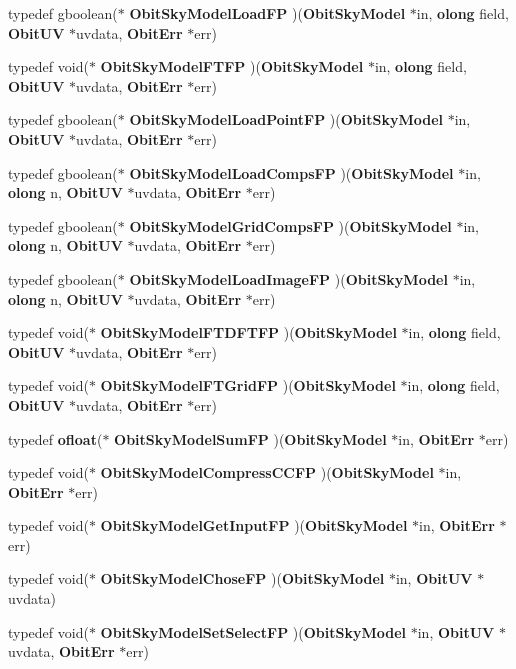 \begin{CompactItemize}
\item 
typedef gboolean($\ast$ {\bf Obit\-Sky\-Model\-Load\-FP} )({\bf Obit\-Sky\-Model} $\ast$in, {\bf olong} field, {\bf Obit\-UV} $\ast$uvdata, {\bf Obit\-Err} $\ast$err)
\item 
typedef void($\ast$ {\bf Obit\-Sky\-Model\-FTFP} )({\bf Obit\-Sky\-Model} $\ast$in, {\bf olong} field, {\bf Obit\-UV} $\ast$uvdata, {\bf Obit\-Err} $\ast$err)
\item 
typedef gboolean($\ast$ {\bf Obit\-Sky\-Model\-Load\-Point\-FP} )({\bf Obit\-Sky\-Model} $\ast$in, {\bf Obit\-UV} $\ast$uvdata, {\bf Obit\-Err} $\ast$err)
\item 
typedef gboolean($\ast$ {\bf Obit\-Sky\-Model\-Load\-Comps\-FP} )({\bf Obit\-Sky\-Model} $\ast$in, {\bf olong} n, {\bf Obit\-UV} $\ast$uvdata, {\bf Obit\-Err} $\ast$err)
\item 
typedef gboolean($\ast$ {\bf Obit\-Sky\-Model\-Grid\-Comps\-FP} )({\bf Obit\-Sky\-Model} $\ast$in, {\bf olong} n, {\bf Obit\-UV} $\ast$uvdata, {\bf Obit\-Err} $\ast$err)
\item 
typedef gboolean($\ast$ {\bf Obit\-Sky\-Model\-Load\-Image\-FP} )({\bf Obit\-Sky\-Model} $\ast$in, {\bf olong} n, {\bf Obit\-UV} $\ast$uvdata, {\bf Obit\-Err} $\ast$err)
\item 
typedef void($\ast$ {\bf Obit\-Sky\-Model\-FTDFTFP} )({\bf Obit\-Sky\-Model} $\ast$in, {\bf olong} field, {\bf Obit\-UV} $\ast$uvdata, {\bf Obit\-Err} $\ast$err)
\item 
typedef void($\ast$ {\bf Obit\-Sky\-Model\-FTGrid\-FP} )({\bf Obit\-Sky\-Model} $\ast$in, {\bf olong} field, {\bf Obit\-UV} $\ast$uvdata, {\bf Obit\-Err} $\ast$err)
\item 
typedef {\bf ofloat}($\ast$ {\bf Obit\-Sky\-Model\-Sum\-FP} )({\bf Obit\-Sky\-Model} $\ast$in, {\bf Obit\-Err} $\ast$err)
\item 
typedef void($\ast$ {\bf Obit\-Sky\-Model\-Compress\-CCFP} )({\bf Obit\-Sky\-Model} $\ast$in, {\bf Obit\-Err} $\ast$err)
\item 
typedef void($\ast$ {\bf Obit\-Sky\-Model\-Get\-Input\-FP} )({\bf Obit\-Sky\-Model} $\ast$in, {\bf Obit\-Err} $\ast$err)
\item 
typedef void($\ast$ {\bf Obit\-Sky\-Model\-Chose\-FP} )({\bf Obit\-Sky\-Model} $\ast$in, {\bf Obit\-UV} $\ast$uvdata)
\item 
typedef void($\ast$ {\bf Obit\-Sky\-Model\-Set\-Select\-FP} )({\bf Obit\-Sky\-Model} $\ast$in, {\bf Obit\-UV} $\ast$uvdata, {\bf Obit\-Err} $\ast$err)
\item 

\end{CompactItemize}

